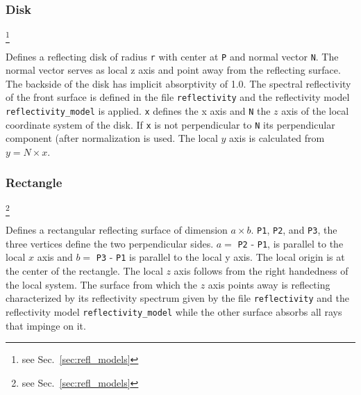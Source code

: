 \documentclass[10pt,a4paper,titlepage]{article}
\begin{document}
\subsubsection{Disk}








\footnote{see Sec.~\ref{sec:refl_models}}

\vspace{0.25cm}
Defines a reflecting disk of radius {\tt r} with center at {\tt P} and normal vector {\tt N}. The normal vector serves as local z axis and point away from the reflecting surface. The backside of the disk has implicit absorptivity of 1.0. The spectral reflectivity of the front surface is defined in the file {\tt reflectivity} and the reflectivity model {\tt reflectivity\_model} is applied. {\tt x} defines the x axis and {\tt N} the $z$ axis of the local coordinate system of the disk. If {\tt x} is not perpendicular to {\tt N} its perpendicular component (after normalization is used. The local $y$ axis is calculated from $y = N \times x$.

\subsubsection{Rectangle}







\footnote{see Sec.~\ref{sec:refl_models}}

\vspace{0.25cm}
Defines a rectangular reflecting surface of dimension $a \times b$. {\tt P1}, {\tt P2}, and {\tt P3}, the three vertices define the two perpendicular sides. $a=$ {\tt P2} - {\tt P1}, is parallel to the local $x$ axis and $b=$ {\tt P3} - {\tt P1} is parallel to the local y axis. The local origin is at the center of the rectangle. The local $z$ axis follows from the right handedness of the local system. The surface from which the $z$ axis points away is reflecting characterized by its reflectivity spectrum given by the file {\tt reflectivity} and the reflectivity model {\tt reflectivity\_model} while the other surface absorbs all rays that impinge on it.
\end{document}
